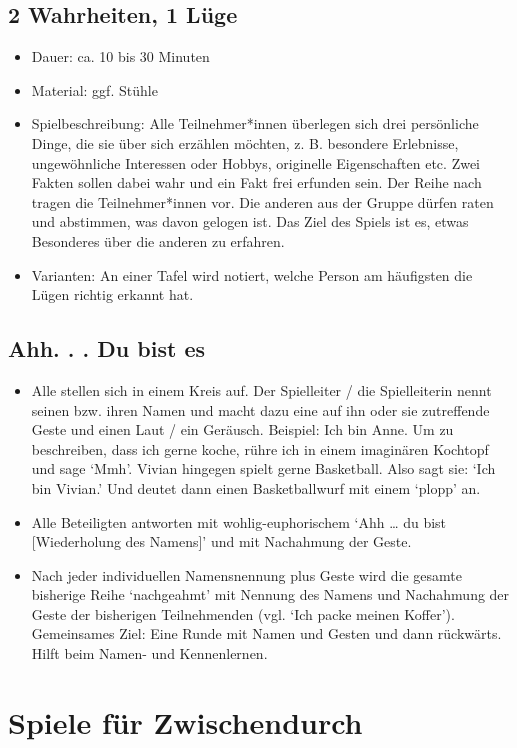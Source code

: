 \documentclass[a4paper, 11pt]{article}
\begin{document}
\subsection{2 Wahrheiten, 1 Lüge}

\begin{itemize}
    \item Dauer: ca. 10 bis 30 Minuten
    \item Material: ggf. Stühle
    \item Spielbeschreibung: Alle Teilnehmer*innen überlegen sich drei persönliche Dinge, die sie über sich erzählen möchten, z. B. besondere Erlebnisse, ungewöhnliche Interessen oder Hobbys, originelle Eigenschaften etc. Zwei Fakten sollen dabei wahr und ein Fakt frei erfunden sein. Der Reihe nach tragen die Teilnehmer*innen vor. Die anderen aus der Gruppe dürfen raten und abstimmen, was davon gelogen ist. Das Ziel des Spiels ist es, etwas Besonderes über die anderen zu erfahren. 
    \item Varianten: An einer Tafel wird notiert, welche Person am häufigsten die Lügen richtig erkannt hat.
\end{itemize}

\subsection{Ahh. . . Du bist es}
\begin{itemize}
    \item Alle stellen sich in einem Kreis auf. Der Spielleiter / die Spielleiterin nennt seinen bzw. ihren Namen und macht dazu eine auf ihn oder sie zutreffende Geste und einen Laut / ein Geräusch. Beispiel: Ich bin Anne. Um zu beschreiben, dass ich gerne koche, rühre ich in einem imaginären Kochtopf und sage `Mmh'. Vivian hingegen spielt gerne Basketball. Also sagt sie: `Ich bin Vivian.' Und deutet dann einen Basketballwurf mit einem `plopp' an.
    \item Alle Beteiligten antworten mit wohlig-euphorischem `Ahh … du bist [Wiederholung des Namens]' und mit Nachahmung der Geste.
    \item Nach jeder individuellen Namensnennung plus Geste wird die gesamte bisherige Reihe `nachgeahmt' mit Nennung des Namens und Nachahmung der Geste der bisherigen Teilnehmenden (vgl. `Ich packe meinen Koffer'). Gemeinsames Ziel: Eine Runde mit Namen und Gesten und dann rückwärts. Hilft beim Namen- und Kennenlernen. 
\end{itemize}

\section{Spiele für Zwischendurch}
\end{document}
